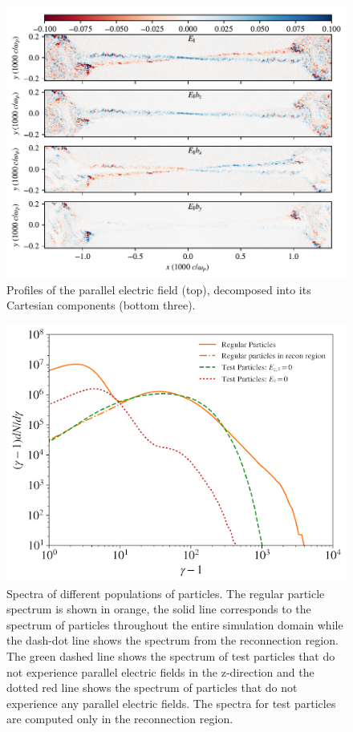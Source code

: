 \documentclass[iop,twocolappendix]{emulateapj}
\begin{document}
\begin{figure}[htp] 
	\includegraphics[width=\linewidth]{testing_singleplot_flds.pdf}
	\caption{Profiles of the parallel electric field (top), decomposed into its Cartesian components (bottom three).}
	\label{edotb_comps}
\end{figure}

\begin{figure}[htp] 
\includegraphics[width=\linewidth]{testspec.png}
\caption{Spectra of different populations of particles.  The regular particle spectrum is shown in orange, the solid line corresponds to the spectrum of particles throughout the entire simulation domain while the dash-dot line shows the spectrum from the reconnection region.  The green dashed line shows the spectrum of test particles that do not experience parallel electric fields in the z-direction and the dotted red line shows the spectrum of particles that do not experience any parallel electric fields.  The spectra for test particles are computed only in the reconnection region.}
\label{testprtl_spec}
\end{figure}
\end{document}
